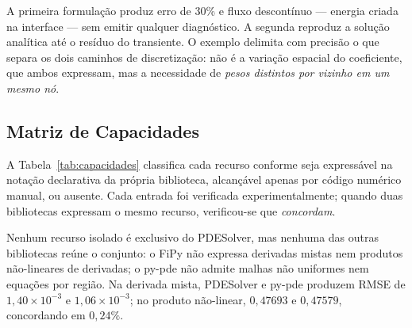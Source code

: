 \documentclass[10pt,brazil,english]{article}
\begin{document}
A primeira formulação produz erro de 30\% e fluxo descontínuo --- energia criada na interface --- sem emitir qualquer diagnóstico. A segunda reproduz a solução analítica até o resíduo do transiente. O exemplo delimita com precisão o que separa os dois caminhos de discretização: não é a variação espacial do coeficiente, que ambos expressam, mas a necessidade de \emph{pesos distintos por vizinho em um mesmo nó}.

\subsection{Matriz de Capacidades}
\label{sec:capacidades}

A Tabela~\ref{tab:capacidades} classifica cada recurso conforme seja expressável na notação declarativa da própria biblioteca, alcançável apenas por código numérico manual, ou ausente. Cada entrada foi verificada experimentalmente; quando duas bibliotecas expressam o mesmo recurso, verificou-se que \emph{concordam}.

\begin{table}[!htb]
\centering
\caption{Capacidades verificadas experimentalmente.}
\label{tab:capacidades}
\end{table}

Nenhum recurso isolado é exclusivo do PDESolver, mas nenhuma das outras bibliotecas reúne o conjunto: o FiPy não expressa derivadas mistas nem produtos não-lineares de derivadas; o py-pde não admite malhas não uniformes nem equações por região. Na derivada mista, PDESolver e py-pde produzem RMSE de $1{,}40\times10^{-3}$ e $1{,}06\times10^{-3}$; no produto não-linear, $0{,}47693$ e $0{,}47579$, concordando em $0{,}24\%$.
\end{document}
